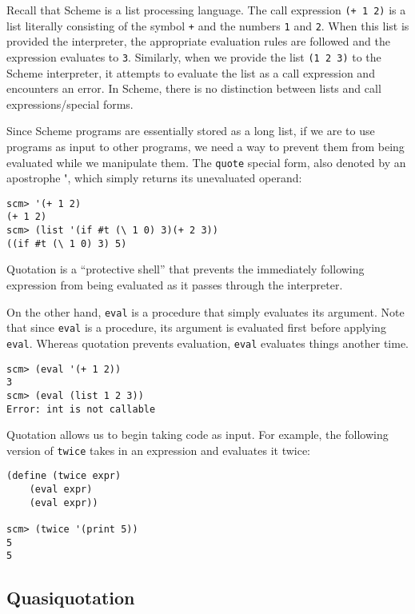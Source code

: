 Recall that Scheme is a list processing language. The call expression \lstinline{(+ 1 2)} is a list literally consisting of the symbol \lstinline{+} and the numbers \lstinline{1} and \lstinline{2}. When this list is provided the interpreter, the appropriate evaluation rules are followed and the expression evaluates to \lstinline{3}. Similarly, when we provide the list \lstinline{(1 2 3)} to the Scheme interpreter, it attempts to evaluate the list as a call expression and encounters an error. In Scheme, there is no distinction between lists and call expressions/special forms. 

Since Scheme programs are essentially stored as a long list, if we are to use programs as input to other programs, we need a way to prevent them from being evaluated while we manipulate them. The \texttt{quote} special form, also denoted by an apostrophe \textbf{\'}, which simply returns its unevaluated operand: 

\begin{lstlisting}
scm> '(+ 1 2)
(+ 1 2)
scm> (list '(if #t (\ 1 0) 3)(+ 2 3))
((if #t (\ 1 0) 3) 5)
\end{lstlisting}

Quotation is a ``protective shell'' that prevents the immediately following expression from being evaluated as it passes through the interpreter.  

On the other hand, \lstinline{eval} is a procedure that simply evaluates its argument. Note that since \lstinline{eval} is a procedure, its argument is evaluated first before applying \lstinline{eval}. Whereas quotation prevents evaluation, \lstinline{eval} evaluates things another time. 
\begin{lstlisting}
scm> (eval '(+ 1 2))
3
scm> (eval (list 1 2 3))
Error: int is not callable
\end{lstlisting}

Quotation allows us to begin taking code as input. For example, the following version of \lstinline{twice} takes in an expression and evaluates it twice: 

\begin{lstlisting}
(define (twice expr)
    (eval expr)
    (eval expr))

scm> (twice '(print 5))
5
5
\end{lstlisting}

\subsection{Quasiquotation}

